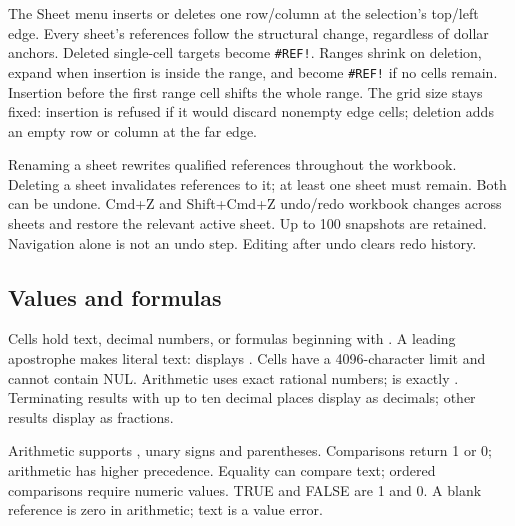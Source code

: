 \documentclass[11pt,letterpaper]{article}
\newcommand{\code}[1]{\texttt{\detokenize{#1}}}
\begin{document}
The Sheet menu inserts or deletes one row/column at the selection's top/left
edge. Every sheet's references follow the structural change, regardless of dollar
anchors. Deleted single-cell targets become \texttt{\#REF!}. Ranges shrink on deletion,
expand when insertion is inside the range, and become \texttt{\#REF!} if no cells
remain. Insertion before the first range cell shifts the whole range. The grid
size stays fixed: insertion is refused if it would discard nonempty edge cells;
deletion adds an empty row or column at the far edge.

Renaming a sheet rewrites qualified references throughout the workbook. Deleting
a sheet invalidates references to it; at least one sheet must remain. Both can be
undone. Cmd+Z and Shift+Cmd+Z undo/redo workbook changes across sheets and restore
the relevant active sheet. Up to 100 snapshots are retained. Navigation alone is
not an undo step. Editing after undo clears redo history.

\subsection{Values and formulas}
Cells hold text, decimal numbers, or formulas beginning with \code{=}. A leading
apostrophe makes literal text: \code{'=1+2} displays \code{=1+2}. Cells have a
4096-character limit and cannot contain NUL. Arithmetic uses exact rational
numbers; \code{0.1+0.2} is exactly \code{0.3}. Terminating results with up to ten
decimal places display as decimals; other results display as fractions.

Arithmetic supports \code{+ - * /}, unary signs and parentheses. Comparisons
\code{= <> < <= > >=} return 1 or 0; arithmetic has higher precedence. Equality
can compare text; ordered comparisons require numeric values. TRUE and FALSE
are 1 and 0. A blank reference is zero in arithmetic; text is a value error.
\end{document}
